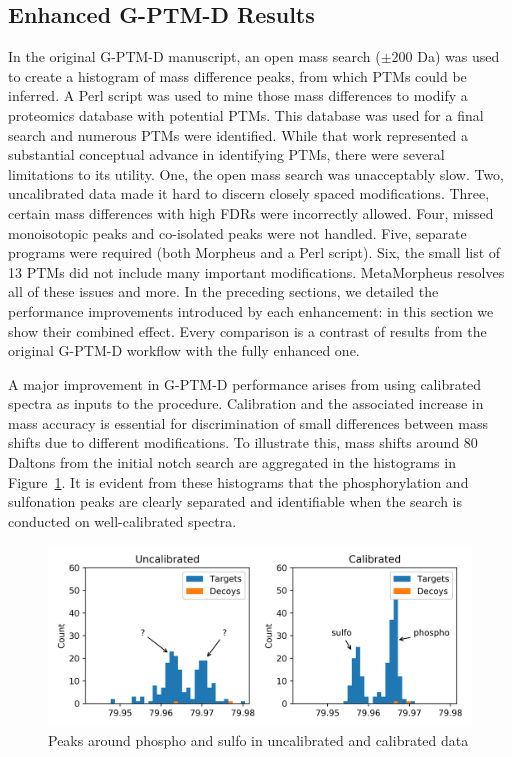 \documentclass[journal=jprobs,manuscript=article]{achemso}
\begin{document}
\subsection{Enhanced G-PTM-D Results}

In the original G-PTM-D manuscript\citep{Li_2016}, an open mass search ($\pm 200$ Da) was used to create a histogram of mass difference peaks, from which PTMs could be inferred.
A Perl script was used to mine those mass differences to modify a proteomics database with potential PTMs.
This database was used for a final search and numerous PTMs were identified.
While that work represented a substantial conceptual advance in identifying PTMs, there were several limitations to its utility.
One, the open mass search was unacceptably slow.
Two, uncalibrated data made it hard to discern closely spaced modifications.
Three, certain mass differences with high FDRs were incorrectly allowed.
Four, missed monoisotopic peaks and co-isolated peaks were not handled.
Five, separate programs were required (both Morpheus and a Perl script).
Six, the small list of 13 PTMs did not include many important modifications.
MetaMorpheus resolves all of these issues and more.
In the preceding sections, we detailed the performance improvements introduced by each enhancement: in this section we show their combined effect.
Every comparison is a contrast of results from the original G-PTM-D workflow with the fully enhanced one.

A major improvement in G-PTM-D performance arises from using calibrated spectra as inputs to the procedure.
Calibration and the associated increase in mass accuracy is essential for discrimination of small differences between mass shifts due to different modifications.
To illustrate this, mass shifts around 80 Daltons from the initial notch search are aggregated in the histograms in Figure~\ref{fig:fig7-PhosphoAndSulfo}.
It is evident from these histograms that the phosphorylation and sulfonation peaks are clearly separated and identifiable when the search is conducted on well-calibrated spectra.


\begin{figure}[H]
\includegraphics{fig7-SulfoAndPhospho.png}
\caption{Peaks around phospho and sulfo in uncalibrated and calibrated data}
\label{fig:fig7-PhosphoAndSulfo}
\end{figure}
\end{document}
